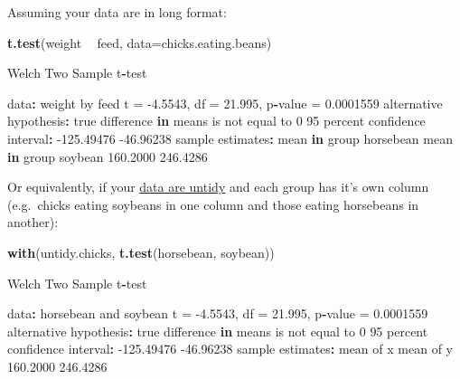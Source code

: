 \documentclass[]{article}
\newenvironment{Shaded}{\begin{snugshade}}{\end{snugshade}}
\newcommand{\ControlFlowTok}[1]{\textcolor[rgb]{0.13,0.29,0.53}{\textbf{#1}}}
\newcommand{\DataTypeTok}[1]{\textcolor[rgb]{0.13,0.29,0.53}{#1}}
\newcommand{\DecValTok}[1]{\textcolor[rgb]{0.00,0.00,0.81}{#1}}
\newcommand{\FloatTok}[1]{\textcolor[rgb]{0.00,0.00,0.81}{#1}}
\newcommand{\KeywordTok}[1]{\textcolor[rgb]{0.13,0.29,0.53}{\textbf{#1}}}
\newcommand{\NormalTok}[1]{#1}
\newcommand{\OperatorTok}[1]{\textcolor[rgb]{0.81,0.36,0.00}{\textbf{#1}}}
\newcommand{\StringTok}[1]{\textcolor[rgb]{0.31,0.60,0.02}{#1}}
\begin{document}
Assuming your data are in long format:

\begin{Shaded}
\begin{Highlighting}[]
\KeywordTok{t.test}\NormalTok{(weight }\OperatorTok{~}\StringTok{ }\NormalTok{feed, }\DataTypeTok{data=}\NormalTok{chicks.eating.beans)}

\NormalTok{    Welch Two Sample t}\OperatorTok{-}\NormalTok{test}

\NormalTok{data}\OperatorTok{:}\StringTok{  }\NormalTok{weight by feed}
\NormalTok{t =}\StringTok{ }\FloatTok{-4.5543}\NormalTok{, df =}\StringTok{ }\FloatTok{21.995}\NormalTok{, p}\OperatorTok{-}\NormalTok{value =}\StringTok{ }\FloatTok{0.0001559}
\NormalTok{alternative hypothesis}\OperatorTok{:}\StringTok{ }\NormalTok{true difference }\ControlFlowTok{in}\NormalTok{ means is not equal to }\DecValTok{0}
\DecValTok{95}\NormalTok{ percent confidence interval}\OperatorTok{:}
\StringTok{ }\FloatTok{-125.49476}  \FloatTok{-46.96238}
\NormalTok{sample estimates}\OperatorTok{:}
\NormalTok{mean }\ControlFlowTok{in}\NormalTok{ group horsebean   mean }\ControlFlowTok{in}\NormalTok{ group soybean }
               \FloatTok{160.2000}                \FloatTok{246.4286} 
\end{Highlighting}
\end{Shaded}

Or equivalently, if your \protect\hyperlink{tidying-data}{data are untidy} and each group has
it's own column (e.g.~chicks eating soybeans in one column and those eating
horsebeans in another):

\begin{Shaded}
\begin{Highlighting}[]
\KeywordTok{with}\NormalTok{(untidy.chicks, }\KeywordTok{t.test}\NormalTok{(horsebean, soybean))}

\NormalTok{    Welch Two Sample t}\OperatorTok{-}\NormalTok{test}

\NormalTok{data}\OperatorTok{:}\StringTok{  }\NormalTok{horsebean and soybean}
\NormalTok{t =}\StringTok{ }\FloatTok{-4.5543}\NormalTok{, df =}\StringTok{ }\FloatTok{21.995}\NormalTok{, p}\OperatorTok{-}\NormalTok{value =}\StringTok{ }\FloatTok{0.0001559}
\NormalTok{alternative hypothesis}\OperatorTok{:}\StringTok{ }\NormalTok{true difference }\ControlFlowTok{in}\NormalTok{ means is not equal to }\DecValTok{0}
\DecValTok{95}\NormalTok{ percent confidence interval}\OperatorTok{:}
\StringTok{ }\FloatTok{-125.49476}  \FloatTok{-46.96238}
\NormalTok{sample estimates}\OperatorTok{:}
\NormalTok{mean of x mean of y }
 \FloatTok{160.2000}  \FloatTok{246.4286} 
\end{Highlighting}
\end{Shaded}
\end{document}
